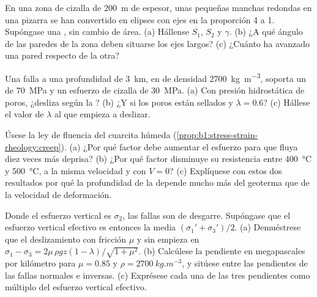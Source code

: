 \begin{exercise}[$\star\star$]\label{exo:b1:stress-strain-rheology:7}
En una zona de cizalla de \qty{200}{m} de espesor, unas pequeñas manchas redondas en una pizarra se han convertido en
elipses con ejes en la proporción 4 a 1. Supóngase una , sin cambio de área. (a) Hállense $S_1$, $S_2$ y
$\gamma$. (b) ¿A qué ángulo de las paredes de la zona deben situarse los ejes largos? (c) ¿Cuánto ha avanzado una pared
respecto de la otra?
\end{exercise}

\begin{exercise}[$\star\star$]\label{exo:b1:stress-strain-rheology:8}
Una falla a una profundidad de \qty{3}{km}, en  de densidad \qty{2700}{kg.m^{-3}}, soporta un  de
\qty{70}{MPa} y un esfuerzo de cizalla de \qty{30}{MPa}. (a) Con presión hidrostática de poros, ¿desliza según la ? (b) ¿Y si los poros están sellados y $\lambda = 0.6$? (c) Hállese el valor de $\lambda$ al que empieza a deslizar.
\end{exercise}

\begin{exercise}[$\star\star$]\label{exo:b1:stress-strain-rheology:9}
Úsese la ley de fluencia del cuarcita húmeda (\cref{prop:b1:stress-strain-rheology:creep}). (a) ¿Por qué factor debe
aumentar el esfuerzo para que fluya diez veces más deprisa? (b) ¿Por qué factor disminuye su resistencia entre
\qty{400}{\degreeCelsius} y \qty{500}{\degreeCelsius}, a la misma velocidad y con $V = 0$? (c) Explíquese con estos dos
resultados por qué la profundidad de la  depende mucho más del geoterma que de la velocidad de
deformación.
\end{exercise}

\begin{exercise}[$\star\star\star$]\label{exo:b1:stress-strain-rheology:10}
Donde el esfuerzo vertical es $\sigma_2$, las fallas son de desgarre. Supóngase que el esfuerzo vertical efectivo es
entonces la media $(\sigma_1' + \sigma_3')/2$. (a) Demuéstrese que el deslizamiento con fricción $\mu$ y sin 
empieza en $\sigma_1 - \sigma_3 = 2\mu\,\rho g z(1-\lambda)/\sqrt{1+\mu^2}$. (b) Calcúlese la pendiente en megapascales por
kilómetro para $\mu = 0.85$ y $\rho = \qty{2700}{kg.m^{-3}}$, y sitúese entre las pendientes de las fallas normales e
inversas. (c) Exprésese cada una de las tres pendientes como múltiplo del esfuerzo vertical efectivo.
\end{exercise}

